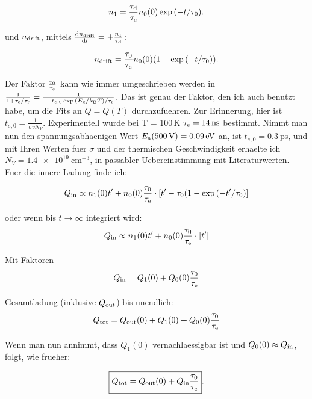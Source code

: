 \begin{equation}
 n_1 = \frac{\tau_{\textrm{d}}}{\tau_\textrm{e}} n_0(0) \exp{(-t / \tau_{0})}. 
\end{equation}

\noindent
und $n_{{\textrm{drift}}}$, mittels $\frac{\mathrm d n_{{\textrm{drift}}}}{\mathrm d t} = + \frac{n_1}{\tau_{\textrm{d}}}$:

\begin{equation}
 n_{{\textrm{drift}}} = \frac{\tau_{0}}{\tau_\textrm{e}} n_0(0) (1 - \exp{(-t / \tau_{0})}).
\end{equation}

\noindent
Der Faktor $\frac{\tau_{0}}{\tau_\textrm{e}}$ kann wie immer umgeschrieben werden in $\frac{1}{1 + \tau_\textrm{e}/\tau_\textrm{r}} = \frac{1}{1 + t_{e,0}\exp{\left( E_{\textrm{x}}/k_{\textrm{B}}T \right)}/\tau_\textrm{r}}$.
Das ist genau der Faktor, den ich auch benutzt habe, um die Fits an $Q=Q(T)$ durchzufuehren. 
Zur Erinnerung, hier ist $t_{e,0} = \frac{1}{\sigma v N_V}$. 
Experimentell wurde bei T = 100\,K $\tauevap = \SI{14}{\ns}$ bestimmt. 
Nimmt man nun den spannungsabhaenigen Wert $\Ea(\SI{500}{\volt}) = \SI{0.09}{\eV}$ an, ist $t_{e,0} = \SI{0.3}{\ps}$, und mit Ihren Werten fuer $\sigma$ und der thermischen Geschwindigkeit erhaelte ich
$\boxed{N_V = \SI{1.4e19}{\centi\meter^{-3}}}$, in passabler Uebereinstimmung mit Literaturwerten. 
Fuer die innere Ladung finde ich:

\begin{equation}
 Q_{\textrm{in}} \propto n_1(0) t' + n_0(0) \frac{\tau_{0}}{\tau_\textrm{e}}\cdot \left[ t' - \tau_{0}(1-\exp{(-t'/\tau_{0})} \right]
\end{equation}

\noindent
oder wenn bis $t\rightarrow \infty$ integriert wird:
\begin{equation}
 Q_{\textrm{in}} \propto n_1(0) t' + n_0(0) \frac{\tau_{0}}{\tau_\textrm{e}}\cdot \left[ t' \right]
\end{equation}

\noindent
Mit Faktoren
\begin{equation}
 Q_{\textrm{in}} = Q_1(0) + Q_0(0) \frac{\tau_{0}}{\tau_\textrm{e}}
\end{equation}

\noindent
Gesamtladung (inklusive $Q_{\textrm{out}}$) bis unendlich:
\begin{equation}
 Q_{\textrm{tot}} = Q_{\textrm{out}}(0) + Q_1(0) + Q_0(0) \frac{\tau_{0}}{\tau_\textrm{e}}
\end{equation}

\noindent
Wenn man nun annimmt, dass $Q_1(0)$ vernachlaessigbar ist und $Q_0(0) \approx Q_{\textrm{in}}$, folgt, wie frueher:

\begin{equation}
 \boxed{Q_{\textrm{tot}} = Q_{\textrm{out}}(0) + Q_{\textrm{in}} \frac{\tau_{0}}{\tau_\textrm{e}}}.
\end{equation}

